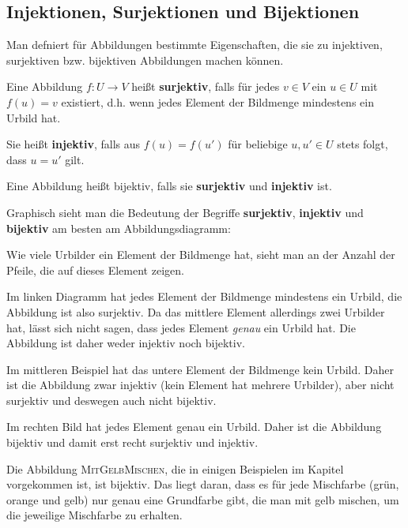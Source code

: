 \documentclass[../../main.tex]{subfiles}
\begin{document}
\subsection*{Injektionen, Surjektionen und Bijektionen}
\pagecolor{violet!20}
\label{advanced:bijektion}
Man defniert für Abbildungen bestimmte Eigenschaften, die sie zu injektiven, surjektiven bzw. bijektiven Abbildungen machen können.

\begin{definition}{}
    Eine Abbildung $f\colon U\rightarrow V$ heißt \textbf{surjektiv}, falls für jedes $v\in V$ ein $u\in U$ mit $f(u)=v$ existiert, d.h. wenn jedes Element der Bildmenge mindestens ein Urbild hat.
    
    Sie heißt \textbf{injektiv}, falls aus $f(u)=f(u')$ für beliebige $u,u'\in U$ stets folgt, dass $u=u'$ gilt. 
    
    Eine Abbildung heißt bijektiv, falls sie \textbf{surjektiv} und \textbf{injektiv} ist.
\end{definition}

Graphisch sieht man die Bedeutung der Begriffe \textbf{surjektiv}, \textbf{injektiv} und \textbf{bijektiv} am besten am Abbildungsdiagramm:
    
\begin{multicols}{3}\centering
    
    
    
    
    
\end{multicols}

Wie viele Urbilder ein Element der Bildmenge hat, sieht man an der Anzahl der Pfeile, die auf dieses Element zeigen.

Im linken Diagramm hat jedes Element der Bildmenge mindestens ein Urbild, die Abbildung ist also surjektiv. Da das mittlere Element allerdings zwei Urbilder hat, lässt sich nicht sagen, dass jedes Element \emph{genau} ein Urbild hat. Die Abbildung ist daher weder injektiv noch bijektiv.

Im mittleren Beispiel hat das untere Element der Bildmenge kein Urbild. Daher ist die Abbildung zwar injektiv (kein Element hat mehrere Urbilder), aber nicht surjektiv und deswegen auch nicht bijektiv.

Im rechten Bild hat jedes Element genau ein Urbild. Daher ist die Abbildung bijektiv und damit erst recht surjektiv und injektiv.

\begin{advexample}{}
    Die Abbildung \textsc{MitGelbMischen}, die in einigen Beispielen im Kapitel vorgekommen ist, ist bijektiv. Das liegt daran, dass es für jede Mischfarbe (grün, orange und gelb) nur genau eine Grundfarbe gibt, die man mit gelb mischen, um die jeweilige Mischfarbe zu erhalten.
\end{advexample}
\end{document}
